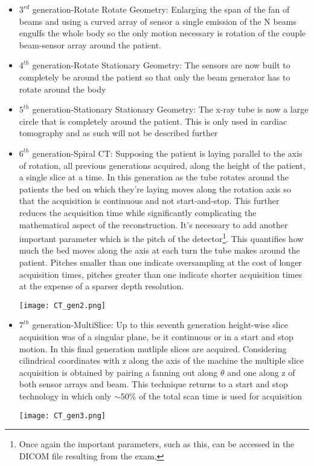 \begin{itemize}
\item $3^{rd}$ generation-Rotate Rotate Geometry: Enlarging the span of the fan of beams and using a curved array of sensor a single emission of the N beams engulfs the whole body so the only motion necessary is rotation of the couple beam-sensor array around the patient.
\item $4^{th}$ generation-Rotate Stationary Geometry: The sensors are now built to completely be around the patient so that only the beam generator has to rotate around the body \newline
\item $5^{th}$ generation-Stationary Stationary Geometry: The x-ray tube is now a large circle that is completely around the patient. This is only used in cardiac tomography and as such will not be described further \cite{Cardiac-CT}
\item $6^{th}$ generation-Spiral CT: Supposing the patient is laying parallel to the axis of rotation, all previous generations acquired, along the height of the patient, a single slice at a time. In this generation as the tube rotates around the patients the bed on which they're laying moves along the rotation axis so that the acquisition is continuous and not start-and-stop. This further reduces the acquisition time while significantly complicating the mathematical aspect of the reconstruction. It's necessary to add another important parameter which is the pitch of the detector\footnote{Once again the important parameters, such as this, can be accessed in the DICOM file resulting from the exam,}. This quantifies how much the bed moves along the axis at each turn the tube makes around the patient. Pitches smaller than one indicate oversampling at the cost of longer acquisition times, pitches greater than one indicate shorter acquisition times at the expense of a sparser depth resolution. \newline
\begin{minipage}{\linewidth}
            \centering
            \texttt{[image: CT\_gen2.png]}
        \end{minipage}
\item $7^{th}$ generation-MultiSlice: Up to this seventh generation height-wise slice acquisition was of a singular plane, be it continuous or in a start and stop motion. In this final generation mutliple slices are acquired. Considering cilindrical coordinates with z along the axis of the machine the multiple slice acquisition is obtained by pairing a fanning out along $\theta$ and one along z of both sensor arrays and beam. This technique returns to a start and stop technology in which only $\sim 50\%$ of the total scan time is used for acquisition
\begin{minipage}{\linewidth}
            \centering
            \texttt{[image: CT\_gen3.png]}
        \end{minipage}
\end{itemize}

